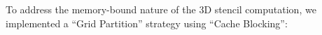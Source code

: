 

To address the memory-bound nature of the 3D stencil computation, we implemented a ``Grid Partition'' strategy using ``Cache Blocking'':

